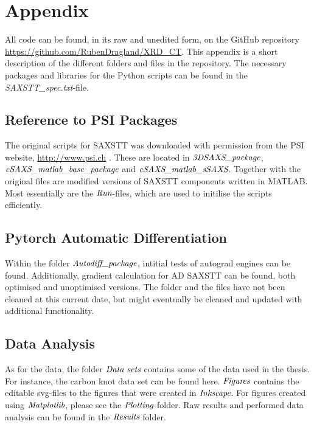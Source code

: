 
\chapter{Appendix}\label{app:appendixB}



All code can be found, in its raw and unedited form, on the GitHub repository \url{https://github.com/RubenDragland/XRD_CT}.
This appendix is a short description of the different folders and files in the repository.
The necessary packages and libraries for the Python scripts can be found in the \emph{SAXSTT\_spec.txt}-file.


\section{Reference to PSI Packages}

The original scripts for SAXSTT was downloaded with permission from the PSI website, \url{http://www.psi.ch} \cite{liebi2015nanostructure}.
These are located in $\emph{3DSAXS\_package}$, \newline $\emph{cSAXS\_matlab\_base\_package}$ and $\emph{cSAXS\_matlab\_sSAXS}$.
Together with the original files are modified versions of SAXSTT components written in MATLAB.
Most essentially are the $\emph{Run}$-files, which are used to initilise the scripts efficiently.

\section{Pytorch Automatic Differentiation}
Within the folder $\emph{Autodiff\_package}$, intitial tests of autograd engines can be found.
Additionally, gradient calculation for AD SAXSTT can be found, both optimised and unoptimised versions.
The folder and the files have not been cleaned at this current date, but might eventually be cleaned and updated with additional functionality.

\section{Data Analysis}
As for the data, the folder $\emph{Data sets}$ contains some of the data used in the thesis.
For instance, the carbon knot data set can be found here.
$\emph{Figures}$ contains the editable svg-files to the figures that were created in $\emph{Inkscape}$.
For figures created using $\emph{Matplotlib}$, please see the $\emph{Plotting}$-folder.
Raw results and performed data analysis can be found in the $\emph{Results}$ folder.



